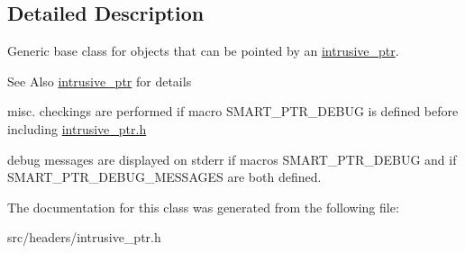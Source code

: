 \subsection{Detailed Description}
Generic base class for objects that can be pointed by an \hyperlink{classintrusive__ptr}{intrusive\-\_\-ptr}.
\begin{DoxyItemize}
\item \begin{DoxySeeAlso}{See Also}
\hyperlink{classintrusive__ptr}{intrusive\-\_\-ptr} for details
\end{DoxySeeAlso}

\item misc. checkings are performed if macro S\-M\-A\-R\-T\-\_\-\-P\-T\-R\-\_\-\-D\-E\-B\-U\-G is defined before including \hyperlink{intrusive__ptr_8h_source}{intrusive\-\_\-ptr.\-h}
\item debug messages are displayed on stderr if macros S\-M\-A\-R\-T\-\_\-\-P\-T\-R\-\_\-\-D\-E\-B\-U\-G and if S\-M\-A\-R\-T\-\_\-\-P\-T\-R\-\_\-\-D\-E\-B\-U\-G\-\_\-\-M\-E\-S\-S\-A\-G\-E\-S are both defined. 
\end{DoxyItemize}

The documentation for this class was generated from the following file\-:\begin{DoxyCompactItemize}
\item 
src/headers/intrusive\-\_\-ptr.\-h\end{DoxyCompactItemize}

